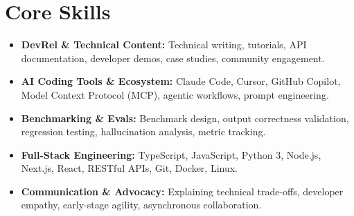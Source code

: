 \documentclass[a4paper,10pt]{article}
\begin{document}
\section{Core Skills}
\begin{itemize}
  \item \textbf{DevRel \& Technical Content:} Technical writing, tutorials, API documentation, developer demos, case studies, community engagement.
  \item \textbf{AI Coding Tools \& Ecosystem:} Claude Code, Cursor, GitHub Copilot, Model Context Protocol (MCP), agentic workflows, prompt engineering.
  \item \textbf{Benchmarking \& Evals:} Benchmark design, output correctness validation, regression testing, hallucination analysis, metric tracking.
  \item \textbf{Full-Stack Engineering:} TypeScript, JavaScript, Python 3, Node.js, Next.js, React, RESTful APIs, Git, Docker, Linux.
  \item \textbf{Communication \& Advocacy:} Explaining technical trade-offs, developer empathy, early-stage agility, asynchronous collaboration.
\end{itemize}
\end{document}
